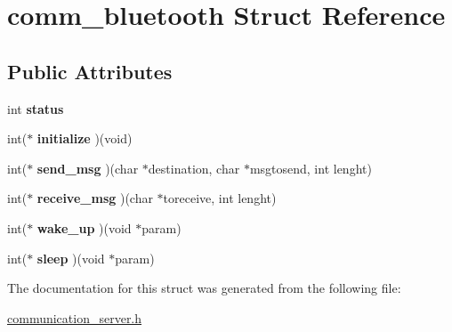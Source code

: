 \hypertarget{structcomm__bluetooth}{}\section{comm\+\_\+bluetooth Struct Reference}
\label{structcomm__bluetooth}
\subsection*{Public Attributes}
\begin{DoxyCompactItemize}
\item 
int {\bfseries status}\hypertarget{structcomm__bluetooth_a30c56c1f7c8f97c0bafc55e8a690a047}{}\label{structcomm__bluetooth_a30c56c1f7c8f97c0bafc55e8a690a047}

\item 
int($\ast$ {\bfseries initialize} )(void)\hypertarget{structcomm__bluetooth_a8fbd32ac35fac9dac17606c915e0fee2}{}\label{structcomm__bluetooth_a8fbd32ac35fac9dac17606c915e0fee2}

\item 
int($\ast$ {\bfseries send\+\_\+msg} )(char $\ast$destination, char $\ast$msgtosend, int lenght)\hypertarget{structcomm__bluetooth_a8f5f32f8b3c183607ca89931679bdfa8}{}\label{structcomm__bluetooth_a8f5f32f8b3c183607ca89931679bdfa8}

\item 
int($\ast$ {\bfseries receive\+\_\+msg} )(char $\ast$toreceive, int lenght)\hypertarget{structcomm__bluetooth_a7a2839ba02baf87efa17adebd8cb99fa}{}\label{structcomm__bluetooth_a7a2839ba02baf87efa17adebd8cb99fa}

\item 
int($\ast$ {\bfseries wake\+\_\+up} )(void $\ast$param)\hypertarget{structcomm__bluetooth_acb4709353579a011659daf3494a41291}{}\label{structcomm__bluetooth_acb4709353579a011659daf3494a41291}

\item 
int($\ast$ {\bfseries sleep} )(void $\ast$param)\hypertarget{structcomm__bluetooth_ad68937930794e9a88ea4b226fbbae58b}{}\label{structcomm__bluetooth_ad68937930794e9a88ea4b226fbbae58b}

\end{DoxyCompactItemize}


The documentation for this struct was generated from the following file\+:\begin{DoxyCompactItemize}
\item 
\hyperlink{communication__server_8h}{communication\+\_\+server.\+h}\end{DoxyCompactItemize}
